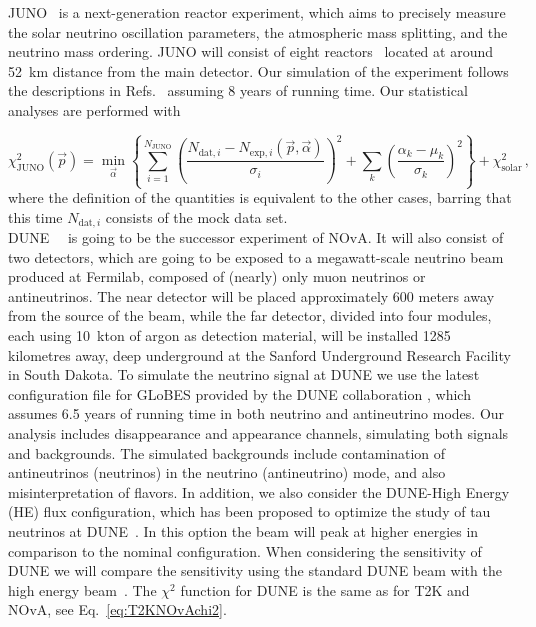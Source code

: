 \documentclass[aps, prd, onecolumn, tightenlines, notitlepage, superscriptaddress, nofootinbib, preprintnumbers, floatfix,showkeys,11pt]{revtex4-2}
\begin{document}
JUNO~\cite{JUNO:2015zny} is a next-generation reactor experiment, which aims to precisely measure the solar neutrino oscillation parameters, the atmospheric mass splitting, and the neutrino mass ordering.
%
JUNO will consist of eight reactors~\cite{IceCube-Gen2:2019fet,JUNO:2021vlw} located at around 52~km distance from the main detector.
%
Our simulation of the experiment follows the descriptions in Refs.~\cite{JUNO:2015zny,IceCube-Gen2:2019fet,JUNO:2021vlw,Forero:2021lax} assuming 8 years of running time.
%
Our statistical analyses are performed with

\begin{equation}
 \chi^2_{\mathrm{JUNO}}(\vec{p}) = \min_{\vec{\alpha}}\left\{\sum_{i=1}^{N_\text{JUNO}}\left(\frac{N_{\text{dat},i} - N_{\text{exp},i}(\vec{p},\vec{\alpha})}{\sigma_i}\right)^2 + \sum_k \left(\frac{\alpha_k - \mu_k}{\sigma_k} \right)^2\right\}  + \chi^2_{\text{solar}}\,,
\end{equation}
where the definition of the quantities is equivalent to the other cases, barring that this time $N_{\text{dat},i}$ consists of the mock data set.\\

DUNE~\cite{DUNE:2020lwj,DUNE:2020ypp,DUNE:2020mra,DUNE:2020txw}~ is going to be the successor experiment of NOvA. It will also consist of two detectors, which are going to be exposed to a megawatt-scale neutrino beam produced at
Fermilab, composed of (nearly) only muon neutrinos or antineutrinos. The
near detector will be placed approximately 600 meters away from the
source of the beam, while the far detector, divided into four
modules, each using 10~kton of argon as detection material, will be
installed 1285 kilometres away, deep underground at the Sanford
Underground Research Facility in South Dakota.
%
To simulate the neutrino signal at DUNE we use the latest configuration file for GLoBES provided by the DUNE collaboration \cite{DUNE:2021cuw}, which assumes 6.5 years of running time in both neutrino and antineutrino modes. 
%
Our analysis includes disappearance and appearance channels, simulating both signals and backgrounds. The simulated backgrounds include contamination of antineutrinos (neutrinos) in the neutrino (antineutrino) mode, and also misinterpretation of flavors. 
%
In addition, we also consider the DUNE-High Energy (HE) flux configuration, which has been proposed to optimize the study of tau neutrinos at DUNE~\cite{DUNEHE}. In this option the beam will peak at higher energies in comparison to the nominal configuration.
When considering the sensitivity of DUNE we will compare the sensitivity using the standard DUNE beam with the high energy beam~\cite{DUNEHE}.
The $\chi^2$ function for DUNE is the same as for T2K and NOvA, see Eq.~\eqref{eq:T2KNOvAchi2}. 
\end{document}
